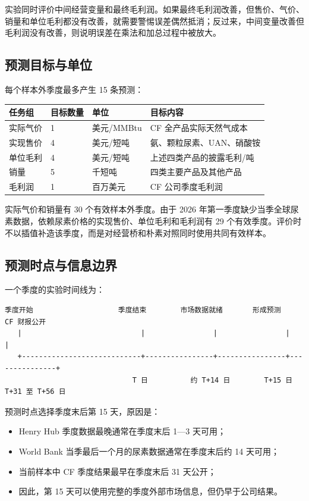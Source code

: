 \documentclass[11pt,a4paper]{ctexart}
\begin{document}
实验同时评价中间经营变量和最终毛利润。如果最终毛利润改善，但售价、气价、销量和单位毛利都没有改善，就需要警惕误差偶然抵消；反过来，中间变量改善但毛利润没有改善，则说明误差在乘法和加总过程中被放大。

\subsection{预测目标与单位}

每个样本外季度最多产生 15 条预测：

\begin{center}
\small
\begin{tabularx}{\textwidth}{L{3.0cm}L{2.0cm}L{3.3cm}Y}
\toprule
任务组 & 目标数量 & 单位 & 目标内容 \\
\midrule
实际气价 & 1 & 美元/MMBtu & CF 全产品实际天然气成本 \\
实现售价 & 4 & 美元/短吨 & 氨、颗粒尿素、UAN、硝酸铵 \\
单位毛利 & 4 & 美元/短吨 & 上述四类产品的披露毛利/吨 \\
销量 & 5 & 千短吨 & 四类主要产品及其他产品 \\
毛利润 & 1 & 百万美元 & CF 公司季度毛利润 \\
\bottomrule
\end{tabularx}
\normalsize
\end{center}

实际气价和销量有 30 个有效样本外季度。由于 2026 年第一季度缺少当季全球尿素数据，依赖尿素价格的实现售价、单位毛利和毛利润有 29 个有效季度。评价时不以插值补造该季度，而是对经营桥和朴素对照同时使用共同有效样本。

\subsection{预测时点与信息边界}

一个季度的实验时间线为：

\begin{verbatim}
季度开始                    季度结束        市场数据就绪       形成预测       CF 财报公开
   |                            |                |                |               |
   +----------------------------+----------------+----------------+---------------+
                              T 日          约 T+14 日        T+15 日       T+31 至 T+56 日
\end{verbatim}

预测时点选择季度末后第 15 天，原因是：

\begin{itemize}
  \item Henry Hub 季度数据最晚通常在季度末后 1---3 天可用；
  \item World Bank 当季最后一个月的尿素数据通常在季度末后约 14 天可用；
  \item 当前样本中 CF 季度结果最早在季度末后 31 天公开；
  \item 因此，第 15 天可以使用完整的季度外部市场信息，但仍早于公司结果。
\end{itemize}
\end{document}
